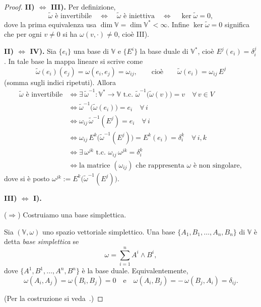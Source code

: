 \begin{proof}
    \noindent\textbf{II) $\Leftrightarrow$ III).}
    Per definizione,
    \[
        \tilde{\omega} \text{ è invertibile} \quad
        \iff \quad \tilde{\omega} \text{ è iniettiva} \quad
        \iff \quad \ker\tilde{\omega} = 0 ,
    \]
    dove la prima equivalenza usa $\dim \mathbb{V} = \dim \mathbb{V}^* < \infty$. Infine $\ker\tilde{\omega}=0$ significa
    che per ogni $v\neq 0$ si ha $\omega(v,\cdot)\neq 0$, cioè III).

    \smallskip\noindent\textbf{II) $\Leftrightarrow$ IV).}
    Sia $\{e_i\}$ una base di $\mathbb{V}$ e $\{E^i\}$ la base duale di $\mathbb{V}^*$, cioè $E^j(e_i)=\delta^j_i$.
    In tale base la mappa lineare si scrive come
    \[
        \tilde{\omega}(e_i)(e_j) = \omega(e_i,e_j) = \omega_{ij} ,
        \qquad\text{cioè}\qquad
        \tilde{\omega}(e_i) = \omega_{ij}\,E^j
    \]
    (somma sugli indici ripetuti). Allora
    \begin{align*}
        \tilde{\omega} \text{ è invertibile}
         & \iff \exists\, \tilde{\omega}^{-1}\colon \mathbb{V}^*\to \mathbb{V} \text{ t.c. }
        \tilde{\omega}^{-1}\bigl(\tilde{\omega}(v)\bigr) = v \quad \forall\, v \in V         \\
         & \iff \tilde{\omega}^{-1}\bigl(\tilde{\omega}(e_i)\bigr) = e_i \quad \forall\, i   \\
         & \iff \omega_{ij}\,\tilde{\omega}^{-1}(E^j) = e_i \quad \forall\, i                \\
         & \iff \omega_{ij}\,E^k\bigl(\tilde{\omega}^{-1}(E^j)\bigr) = E^k(e_i) = \delta_i^k
        \quad \forall\, i,k                                                                  \\
         & \iff \exists\, \omega^{jk} \text{ t.c. } \omega_{ij}\,\omega^{jk} = \delta_i^k    \\
         & \iff \text{la matrice } (\omega_{ij}) \text{ che rappresenta } \omega
        \text{ è non singolare},
    \end{align*}
    dove si è posto $\omega^{jk} := E^k\bigl(\tilde{\omega}^{-1}(E^j)\bigr)$.

    \smallskip\noindent\textbf{III) $\Leftrightarrow$ I).}

    \noindent($\Rightarrow$) Costruiamo una base simplettica.
    \begin{definition}
        Sia $(\mathbb{V},\omega)$ uno spazio vettoriale simplettico. Una base
        $\{A_1,B_1,\dots,A_n,B_n\}$ di $\mathbb{V}$ è detta \emph{base simplettica} se
        \[
            \omega = \sum_{i=1}^n A^i \wedge B^i ,
        \]
        dove $\{A^1,B^1,\dots,A^n,B^n\}$ è la base duale.
        Equivalentemente,
        \[
            \omega(A_i,A_j) = \omega(B_i,B_j) = 0
            \quad\text{e}\quad
            \omega(A_i,B_j) = -\,\omega(B_j,A_i) = \delta_{ij} .
        \]
    \end{definition}
    (Per la costruzione si veda~\cite{lee_manifolds}.)


\end{proof}
